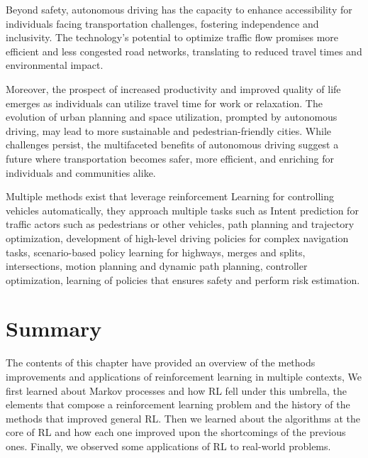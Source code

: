 Beyond safety, autonomous driving has the capacity to enhance accessibility for individuals facing transportation challenges, fostering independence and inclusivity. The technology's potential to optimize traffic flow promises more efficient and less congested road networks, translating to reduced travel times and environmental impact. 

Moreover, the prospect of increased productivity and improved quality of life emerges as individuals can utilize travel time for work or relaxation. The evolution of urban planning and space utilization, prompted by autonomous driving, may lead to more sustainable and pedestrian-friendly cities. While challenges persist, the multifaceted benefits of autonomous driving suggest a future where transportation becomes safer, more efficient, and enriching for individuals and communities alike.

Multiple methods exist that leverage reinforcement Learning for controlling vehicles automatically, they approach multiple tasks such as Intent prediction for traffic actors such as pedestrians or other vehicles, path planning and trajectory optimization, development of high-level driving policies for complex navigation tasks,  scenario-based policy learning for highways, merges and splits, intersections, motion planning and dynamic path planning, controller optimization, learning of policies that ensures safety and perform risk estimation\cite{kiran2021deep}.

\section{Summary}\label{sec:rl-summary}
The contents of this chapter have provided an overview of the methods improvements and applications of reinforcement learning in multiple contexts, We first learned about Markov processes and how RL fell under this umbrella, the elements that compose a reinforcement learning problem and the history of the methods that improved general RL. Then we learned about the algorithms at the core of RL and how each one improved upon the shortcomings of the previous ones. Finally, we observed some applications of RL to real-world problems.

